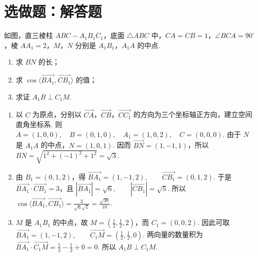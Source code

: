 \section{选做题：解答题}

\begin{problem}[甲]
如图，直三棱柱 \(ABC - A_{1}B_{1}C_{1}\)，底面 \(\triangle ABC\) 中，\(CA = CB = 1\)，\(\angle BCA = 90^{\circ}\)，棱 \(AA_{1} = 2\)，\(M\)，\(N\) 分别是 \(A_{1}B_{1}\)，\(A_{1}A\) 的中点.

\begin{enumerate}
\item 求 \(\overline{BN}\) 的长；
\item 求 \(\cos\langle\overrightarrow{BA_{1}},\overrightarrow{CB_{1}}\rangle\) 的值；
\item 求证 \(A_{1}B \perp C_{1}M\).
\end{enumerate}

\end{problem}

\begin{solution}
\begin{enumerate}
\item 以 \(C\) 为原点，分别以 \(\overrightarrow{CA}\)，\(\overrightarrow{CB}\)，\(\overrightarrow{CC_{1}}\) 的方向为三个坐标轴正方向，建立空间直角坐标系. 则
\(
A=(1,0,0),\quad B=(0,1,0),\quad A_{1}=(1,0,2),\quad C=(0,0,0)
\).
由于 \(N\) 是 \(A_{1}A\) 的中点，\(N=(1,0,1)\). 因而
\(
\overrightarrow{BN}=(1,-1,1)
\)，所以
\(
\overline{BN}=\sqrt{1^{2}+(-1)^{2}+1^{2}}=\sqrt{3}
\).

\item 由 \(B_{1}=(0,1,2)\)，得
\(
\overrightarrow{BA_{1}}=(1,-1,2),\qquad \overrightarrow{CB_{1}}=(0,1,2)
\).
于是
\(
\overrightarrow{BA_{1}}\cdot\overrightarrow{CB_{1}}=3
\)，且
\(
|\overrightarrow{BA_{1}}|=\sqrt{6},\qquad |\overrightarrow{CB_{1}}|=\sqrt{5}
\).
所以
\(
\cos\langle\overrightarrow{BA_{1}},\overrightarrow{CB_{1}}\rangle
=\frac{3}{\sqrt{6}\sqrt{5}}=\frac{\sqrt{30}}{10}
\).

\item \(M\) 是 \(A_{1}B_{1}\) 的中点，故 \(M=\left(\frac12,\frac12,2\right)\)，而 \(C_{1}=(0,0,2)\). 因此可取
\(
\overrightarrow{BA_{1}}=(1,-1,2),\qquad \overrightarrow{C_{1}M}=\left(\frac12,\frac12,0\right)
\).
两向量的数量积为
\(
\overrightarrow{BA_{1}}\cdot\overrightarrow{C_{1}M}=\frac12-\frac12+0=0
\).
所以 \(A_{1}B\perp C_{1}M\).
\end{enumerate}
\end{solution}

